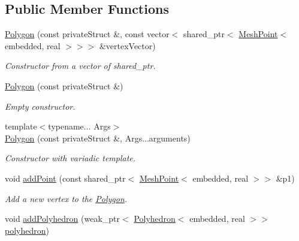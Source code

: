\subsection*{Public Member Functions}
\begin{DoxyCompactItemize}
\item 
\hyperlink{class_polygon_af5bca80e9a6a306460d7235cd5436385}{Polygon} (const private\+Struct \&, const vector$<$ shared\+\_\+ptr$<$ \hyperlink{class_mesh_point}{Mesh\+Point}$<$ embedded, real $>$$>$$>$ \&vertex\+Vector)
\begin{DoxyCompactList}\small\item\em Constructor from a vector of shared\+\_\+ptr. \end{DoxyCompactList}\item 
\hyperlink{class_polygon_a13a8d5ce1ddba0c542fdbb667b0a9cc9}{Polygon} (const private\+Struct \&)
\begin{DoxyCompactList}\small\item\em Empty constructor. \end{DoxyCompactList}\item 
{\footnotesize template$<$typename... Args$>$ }\\\hyperlink{class_polygon_aeeae92fe9691e9bba131228f38ac08a7}{Polygon} (const private\+Struct \&, Args...\+arguments)
\begin{DoxyCompactList}\small\item\em Constructor with variadic template. \end{DoxyCompactList}\item 
void \hyperlink{class_polygon_af227451b2f12b89bab30c619f3805d97}{add\+Point} (const shared\+\_\+ptr$<$ \hyperlink{class_mesh_point}{Mesh\+Point}$<$ embedded, real $>$$>$ \&p1)\hypertarget{class_polygon_af227451b2f12b89bab30c619f3805d97}{}\label{class_polygon_af227451b2f12b89bab30c619f3805d97}

\begin{DoxyCompactList}\small\item\em Add a new vertex to the \hyperlink{class_polygon}{Polygon}. \end{DoxyCompactList}\item 
void \hyperlink{class_polygon_a663e3901b49a938202abc2ac89d963df}{add\+Polyhedron} (weak\+\_\+ptr$<$ \hyperlink{class_polyhedron}{Polyhedron}$<$ embedded, real $>$$>$ \hyperlink{class_polygon_a57bfc8000b2c43678fcc5841252f744d}{polyhedron})\hypertarget{class_polygon_a663e3901b49a938202abc2ac89d963df}{}\label{class_polygon_a663e3901b49a938202abc2ac89d963df}


\end{DoxyCompactItemize}
